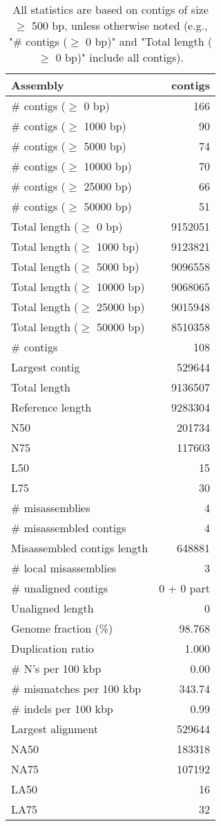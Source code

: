 \documentclass[12pt,a4paper]{article}
\begin{document}
\begin{table}[ht]
\begin{center}
\caption{All statistics are based on contigs of size $\geq$ 500 bp, unless otherwise noted (e.g., "\# contigs ($\geq$ 0 bp)" and "Total length ($\geq$ 0 bp)" include all contigs).}
\begin{tabular}{|l*{1}{|r}|}
\hline
Assembly & contigs \\ \hline
\# contigs ($\geq$ 0 bp) & 166 \\ \hline
\# contigs ($\geq$ 1000 bp) & 90 \\ \hline
\# contigs ($\geq$ 5000 bp) & 74 \\ \hline
\# contigs ($\geq$ 10000 bp) & 70 \\ \hline
\# contigs ($\geq$ 25000 bp) & 66 \\ \hline
\# contigs ($\geq$ 50000 bp) & 51 \\ \hline
Total length ($\geq$ 0 bp) & 9152051 \\ \hline
Total length ($\geq$ 1000 bp) & 9123821 \\ \hline
Total length ($\geq$ 5000 bp) & 9096558 \\ \hline
Total length ($\geq$ 10000 bp) & 9068065 \\ \hline
Total length ($\geq$ 25000 bp) & 9015948 \\ \hline
Total length ($\geq$ 50000 bp) & 8510358 \\ \hline
\# contigs & 108 \\ \hline
Largest contig & 529644 \\ \hline
Total length & 9136507 \\ \hline
Reference length & 9283304 \\ \hline
N50 & 201734 \\ \hline
N75 & 117603 \\ \hline
L50 & 15 \\ \hline
L75 & 30 \\ \hline
\# misassemblies & 4 \\ \hline
\# misassembled contigs & 4 \\ \hline
Misassembled contigs length & 648881 \\ \hline
\# local misassemblies & 3 \\ \hline
\# unaligned contigs & 0 + 0 part \\ \hline
Unaligned length & 0 \\ \hline
Genome fraction (\%) & 98.768 \\ \hline
Duplication ratio & 1.000 \\ \hline
\# N's per 100 kbp & 0.00 \\ \hline
\# mismatches per 100 kbp & 343.74 \\ \hline
\# indels per 100 kbp & 0.99 \\ \hline
Largest alignment & 529644 \\ \hline
NA50 & 183318 \\ \hline
NA75 & 107192 \\ \hline
LA50 & 16 \\ \hline
LA75 & 32 \\ \hline
\end{tabular}
\end{center}
\end{table}
\end{document}
